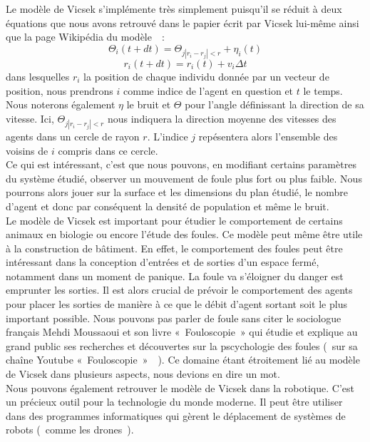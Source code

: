 \documentclass[french, a4paper, 12pt]{article}
\begin{document}
	Le modèle de Vicsek s'implémente très simplement puisqu'il se réduit à deux équations que nous avons retrouvé dans le papier écrit par Vicsek lui-même ainsi que la page Wikipédia du modèle~\cite{vicsek-paper, wiki-model}~:
	\[
		\Theta_{i}(t+dt) = \Theta_{j |r_{i}-r_{j}|<r} + \eta_{i}(t)
	\]
	\[
		r_{i}(t+dt) = r_{i}(t) + v_{i}\Delta t
	\]
	dans lesquelles $r_{i}$ la position de chaque individu donnée par un vecteur de position, nous prendrons $i$ comme indice de l'agent en question et $t$ le temps. Nous noterons également $\eta$ le bruit et $\Theta$ pour l’angle définissant la direction de sa vitesse. Ici, $\Theta_{j |r_{i}-r_{j}|<r}$ nous indiquera la direction moyenne des vitesses des agents dans un cercle de rayon $r$. L'indice $j$ repésentera alors l'ensemble des voisins de $i$ compris dans ce cercle.\\

	Ce qui est intéressant, c'est que nous pouvons, en modifiant certains paramètres du système étudié, observer un mouvement de foule plus fort ou plus faible. Nous pourrons alors jouer sur la surface et les dimensions du plan étudié, le nombre d'agent et donc par conséquent la densité de population et même le bruit.\\

	Le modèle de Vicsek est important pour étudier le comportement de certains animaux en biologie ou encore l'étude des foules. Ce modèle peut même être utile à la construction de bâtiment. En effet, le comportement des foules peut être intéressant dans la conception d'entrées et de sorties d'un espace fermé, notamment dans un moment de panique. La foule va s'éloigner du danger est emprunter les sorties. Il est alors crucial de prévoir le comportement des agents pour placer les sorties de manière à ce que le débit d'agent sortant soit le plus important possible. Nous pouvons pas parler de foule sans citer le sociologue français Mehdi Moussaoui et son livre «~Fouloscopie~» qui étudie et explique au grand public ses recherches et découvertes sur la pscychologie des foules (~sur sa chaîne Youtube «~Fouloscopie~»~\cite{fouloscopie}~). Ce domaine étant étroitement lié au modèle de Vicsek dans plusieurs aspects, nous devions en dire un mot. \\

	Nous pouvons également retrouver le modèle de Vicsek dans la robotique. C'est un précieux outil pour la technologie du monde moderne. Il peut être utiliser dans des programmes informatiques qui gèrent le déplacement de systèmes de robots (~comme les drones~).\\ 
\end{document}
